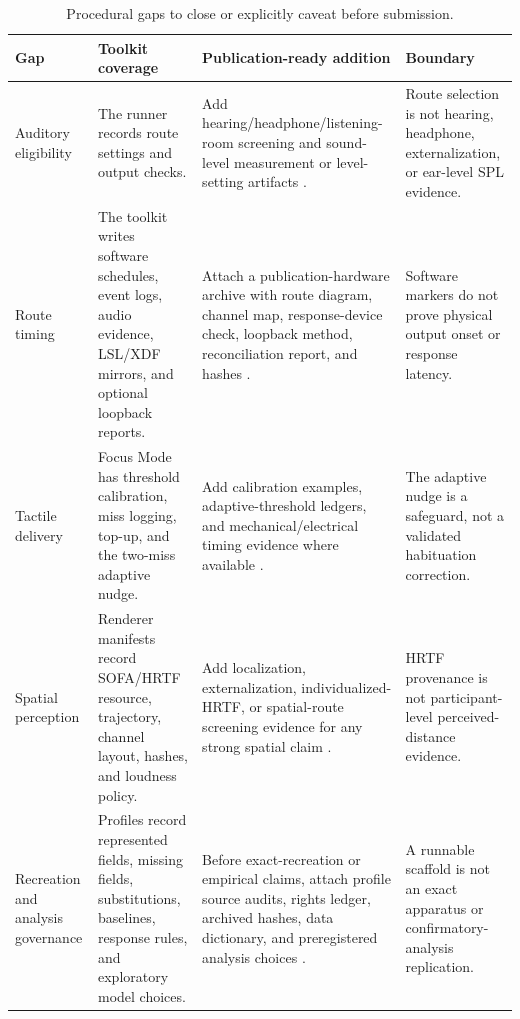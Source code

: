 \documentclass[pdflatex,sn-apa]{sn-jnl}
\begin{document}
\begin{table}[t]
\caption{Procedural gaps to close or explicitly caveat before submission.}
\label{tab:gap-register}
\footnotesize
\begin{tabularx}{\textwidth}{>{\raggedright\arraybackslash}p{} >{\raggedright\arraybackslash}X >{\raggedright\arraybackslash}p{} >{\raggedright\arraybackslash}p{}}
\toprule
Gap & Toolkit coverage & Publication-ready addition & Boundary \\
\midrule
Auditory eligibility & The runner records route settings and output checks. & Add hearing/headphone/listening-room screening and sound-level measurement or level-setting artifacts \citep{Mok2023,Milne2021}. & Route selection is not hearing, headphone, externalization, or ear-level SPL evidence. \\
Route timing & The toolkit writes software schedules, event logs, audio evidence, LSL/XDF mirrors, and optional loopback reports. & Attach a publication-hardware archive with route diagram, channel map, response-device check, loopback method, reconciliation report, and hashes \citep{Bridges2020,Reimers2016,Garaizar2019,Pronk2020}. & Software markers do not prove physical output onset or response latency. \\
Tactile delivery & Focus Mode has threshold calibration, miss logging, top-up, and the two-miss adaptive nudge. & Add calibration examples, adaptive-threshold ledgers, and mechanical/electrical timing evidence where available \citep{Hirst2026,Merchel2020,Mikkelsen2020,Goble1993,Pate2024}. & The adaptive nudge is a safeguard, not a validated habituation correction. \\
Spatial perception & Renderer manifests record SOFA/HRTF resource, trajectory, channel layout, hashes, and loudness policy. & Add localization, externalization, individualized-HRTF, or spatial-route screening evidence for any strong spatial claim \citep{CuevasRodriguez2019,Salvador2018,Parseihian2014,Kan2009,Spagnol2017}. & HRTF provenance is not participant-level perceived-distance evidence. \\
Recreation and analysis governance & Profiles record represented fields, missing fields, substitutions, baselines, response rules, and exploratory model choices. & Before exact-recreation or empirical claims, attach profile source audits, rights ledger, archived hashes, data dictionary, and preregistered analysis choices \citep{Holmes2020,DeLeeuw2022,Ellis2024}. & A runnable scaffold is not an exact apparatus or confirmatory-analysis replication. \\
\bottomrule
\end{tabularx}
\end{table}
\end{document}
